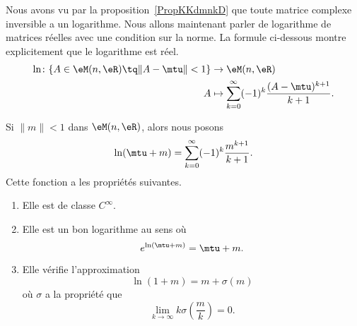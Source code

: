 Nous avons vu par la proposition~\ref{PropKKdmnkD} que toute matrice complexe inversible a un logarithme. Nous allons maintenant parler de logarithme de matrices réelles avec une condition sur la norme. La formule ci-dessous montre explicitement que le logarithme est réel.
\begin{equation}
	\begin{aligned}
		\ln\colon \{ A\in \eM(n,\eR)\tq \| A-\mtu \| <1 \} & \to \eM(n,\eR)                                                   \\
		A                                                  & \mapsto \sum_{k=0}^{\infty}(-1)^k\frac{ (A-\mtu)^{k+1} }{ k+1 }.
	\end{aligned}
\end{equation}

\begin{lemma}   \label{LemQZIQxaB}
	Si \( \| m \|<1\) dans \( \eM(n,\eR)\), alors nous posons
	\begin{equation}    \label{EqIKgMabb}
		\ln(\mtu+m)=\sum_{k=0}^{\infty}(-1)^k\frac{ m^{k+1} }{ k+1 }.
	\end{equation}
	Cette fonction a les propriétés suivantes.
	\begin{enumerate}
		\item
		      Elle est de classe \(  C^{\infty}\).
		\item
		      Elle est un bon logarithme au sens où
		      \begin{equation}
			      e^{\ln(\mtu+m)}=\mtu+m.
		      \end{equation}
		\item
		      Elle vérifie l'approximation
		      \begin{equation}
			      \ln(1+m)=m+\sigma(m)
		      \end{equation}
		      où \( \sigma\) a la propriété que
		      \begin{equation}
			      \lim_{k\to \infty} k\sigma\left( \frac{ m }{ k } \right)=0.
		      \end{equation}
	\end{enumerate}
\end{lemma}

